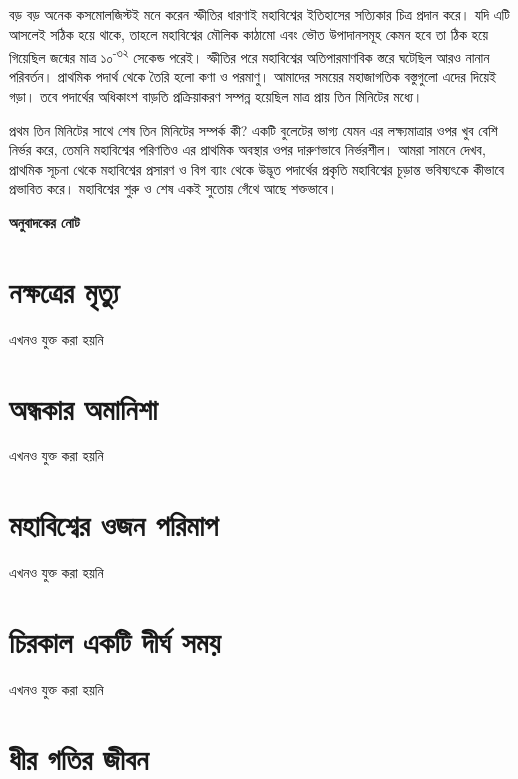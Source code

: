 \documentclass[
]{book}
\begin{document}
বড় বড় অনেক কসমোলজিস্টই মনে করেন স্ফীতির ধারণাই মহাবিশ্বের ইতিহাসের সত্যিকার চিত্র প্রদান করে। যদি এটি আসলেই সঠিক হয়ে থাকে, তাহলে মহাবিশ্বের মৌলিক কাঠামো এবং ভৌত উপাদানসমূহ কেমন হবে তা ঠিক হয়ে গিয়েছিল জন্মের মাত্র ১০\textsuperscript{-৩২} সেকেন্ড পরেই। স্ফীতির পরে মহাবিশ্বের অতিপারমাণবিক স্তরে ঘটেছিল আরও নানান পরিবর্তন। প্রাথমিক পদার্থ থেকে তৈরি হলো কণা ও পরমাণু। আমাদের সময়ের মহাজাগতিক বস্তুগুলো এদের দিয়েই গড়া। তবে পদার্থের অধিকাংশ বাড়তি প্রক্রিয়াকরণ সম্পন্ন হয়েছিল মাত্র প্রায় তিন মিনিটের মধ্যে।

প্রথম তিন মিনিটের সাথে শেষ তিন মিনিটের সম্পর্ক কী? একটি বুলেটের ভাগ্য যেমন এর লক্ষ্যমাত্রার ওপর খুব বেশি নির্ভর করে, তেমনি মহাবিশ্বের পরিণতিও এর প্রাথমিক অবস্থার ওপর দারুণভাবে নির্ভরশীল। আমরা সামনে দেখব, প্রাথমিক সূচনা থেকে মহাবিশ্বের প্রসারণ ও বিগ ব্যাং থেকে উদ্ভূত পদার্থের প্রকৃতি মহাবিশ্বের চূড়ান্ত ভবিষ্যৎকে কীভাবে প্রভাবিত করে। মহাবিশ্বের শুরু ও শেষ একই সুতোয় গেঁথে আছে শক্তভাবে।

\textbf{অনুবাদকের নোট}

\hypertarget{stardooom}{%
\section{নক্ষত্রের মৃত্যু}\label{stardooom}}

এখনও যুক্ত করা হয়নি

\hypertarget{nightfall}{%
\section{অন্ধকার অমানিশা}\label{nightfall}}

এখনও যুক্ত করা হয়নি

\hypertarget{weighing-universe}{%
\section{মহাবিশ্বের ওজন পরিমাপ}\label{weighing-universe}}

এখনও যুক্ত করা হয়নি

\hypertarget{forever}{%
\section{চিরকাল একটি দীর্ঘ সময়}\label{forever}}

এখনও যুক্ত করা হয়নি

\hypertarget{slow-lane}{%
\section{ধীর গতির জীবন}\label{slow-lane}}
\end{document}
